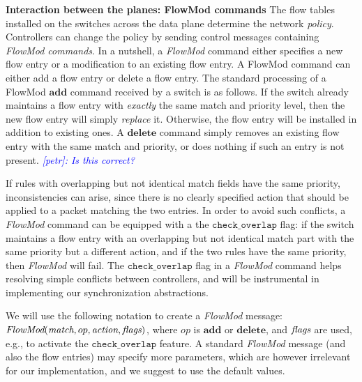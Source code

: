 \documentclass[conference]{sigcomm-alternate}
\newcommand{\add}{\textbf{add}\xspace}
\newcommand{\dele}{\textbf{delete}\xspace}
\newcommand{\FlowMod}{\emph{FlowMod}\xspace}
\newcommand{\match}{\emph{match}\xspace}
\newcommand{\action}{\emph{action}\xspace}
\newcommand{\flags}{\emph{flags}\xspace}
\newcommand{\checko}{\texttt{check\_overlap}\xspace}
\newcommand{\petr}[1]{\textit{\textcolor{blue}{[petr]: #1}}} %
\begin{document}
\noindent\textbf{Interaction between the planes: FlowMod commands}
The flow tables installed on the switches across the data plane
determine the network \emph{policy}.
Controllers can change the policy by sending
control messages containing \emph{FlowMod commands}.
In a nutshell, a \emph{FlowMod} command either specifies a new flow entry or
a modification to an existing flow entry.
%
%
%
%
A FlowMod command can either add a flow entry or delete a flow entry.
The standard processing of a FlowMod $\add$ command received by a switch is
as follows.
If the switch already maintains a flow entry with \emph{exactly} the
same match and priority level, then the new flow entry will simply \emph{replace} it.
Otherwise, the flow entry will be installed in addition to existing
ones.
A $\dele$ command simply removes an existing flow entry with the same
match and priority,  or does nothing if such an entry is not present.
\petr{Is this correct?}


If rules with overlapping but not identical match fields have the same priority,
inconsistencies can arise, since there is no clearly specified action
that should be applied to a packet matching the two entries.
In order to avoid such conflicts, a \emph{FlowMod} command can be equipped with a the $\checko$ flag:
if the switch maintains a flow entry with an overlapping but not
identical match part with the same priority but a different action,
 and if the two rules have the same priority, then
\emph{FlowMod} will fail.
The $\checko$ flag in a \emph{FlowMod} command helps resolving simple
conflicts between controllers, and will be instrumental
in implementing our synchronization abstractions.

We will use the following notation to create a \emph{FlowMod} message:
$\FlowMod(\match, op, \action, \flags)$, where
$op$ is $\add$ or $\dele$, and $\flags$ are used, e.g.,  to activate the $\checko$
feature.
A standard \emph{FlowMod} message (and also the flow entries) may specify
more parameters, which are however irrelevant for our implementation, and we suggest to
use the default values.
\end{document}
